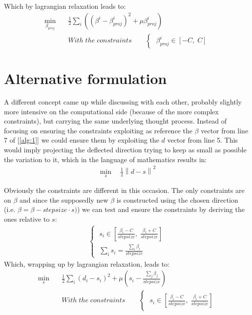 \documentclass[12pt]{article}
\newcommand{\norm}[1]{\left\lVert#1\right\rVert}
\begin{document}
	Which by lagrangian relaxation leads to:
	\begin{equation}\label{eq:10}
	    \begin{aligned}
	    \min_{\beta_{proj}} \quad &\frac{1}{2}\sum_i((\beta^i - \beta_{proj}^i)^2 + \mu \beta_{proj}^i)\\
		&With\;the\;constraints\qquad
        \begin{cases}
            \;\beta_{proj}^i\in[-C,\;C] 
        \end{cases}
        \end{aligned}
	\end{equation}
    
    
    \section{Alternative formulation}
    A different concept came up while discussing with each other, probably slightly more intensive on the computational side (because of the more complex constraints), but carrying the same underlying thought process. Instead of focusing on ensuring the constraints exploiting as reference the $\beta$ vector from line 7 of [\ref{alg:1}] we could ensure them by exploiting the $d$ vector from line 5. This would imply projecting the deflected direction trying to keep as small as possible the variation to it, which in the language of mathematics results in:
    \begin{equation}\label{eq:11}
	    \begin{aligned}
	    \min_{s} \quad \frac{1}{2}\norm{d - s}^2
        \end{aligned}
	\end{equation}
	
	Obviously the constraints are different in this occasion. The only constraints are on $\beta$ and since the supposedly new $\beta$ is constructed using the chosen direction (i.e. $\beta = \beta - stepsize \cdot s)$) we can test and ensure the constraints by deriving the ones relative to $s$:
	\begin{equation}
	    \begin{aligned}
        \begin{cases}
            \;s_i\in[\frac{\beta_i-C}{stepsize},\;\frac{\beta_i+C}{stepsize}]\\
            \;\sum_i s_i = \frac{\sum_i\beta_i}{stepsize}
        \end{cases}
        \end{aligned}
	\end{equation}
	Which, wrapping up by lagrangian relaxation, leads to:
	\begin{equation}\label{eq:6}
	    \begin{aligned}
	    \min_{s} \quad &\frac{1}{2}\sum_i(d_i - s_i)^2 + \mu(s_i - \frac{\sum_j\beta_j}{stepsize})\\
	    &With\;the\;constraints\qquad
	    \begin{cases}
            \;s_i\in[\frac{\beta_i-C}{stepsize},\;\frac{\beta_i+C}{stepsize}]
        \end{cases}
        \end{aligned}
	\end{equation}
	
\end{document}
